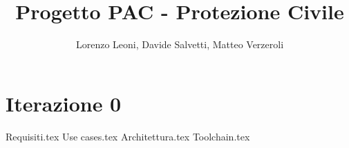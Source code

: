 \documentclass[
		a4paper,
		cleardoublepage=empty,
		headings=twolinechapter,
		numbers=autoenddot,
]{article}
\title{Progetto PAC - Protezione Civile}
\author{Lorenzo Leoni, Davide Salvetti, Matteo Verzeroli}
\begin{document}
	\maketitle
	
	
	\section{Iterazione 0}
	{Requisiti.tex}
	{Use cases.tex}
	{Architettura.tex}
	\clearpage
	{Toolchain.tex}
	
	
\end{document}
